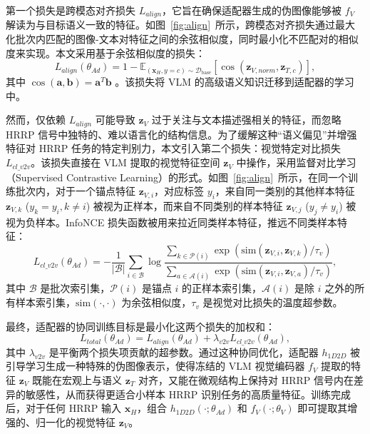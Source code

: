 第一个损失是跨模态对齐损失 $L_{align}$，它旨在确保适配器生成的伪图像能够被 $f_V$ 解读为与目标语义一致的特征。如图~\ref{fig:align}~所示，跨模态对齐损失通过最大化批次内匹配的图像-文本对特征之间的余弦相似度，同时最小化不匹配对的相似度来实现。本文采用基于余弦相似度的损失： \begin{equation} L_{align}(\theta_{Ad}) = 1 - \mathbb{E}_{(\mathbf{x}_H, y=c) \sim \mathcal{D}_{\text{base}}} \left[ \cos(\mathbf{z}_{V, norm}, \mathbf{z}_{T,c}) \right], \label{eq:adapter_align_loss_detail} \end{equation} 其中 $\cos(\mathbf{a}, \mathbf{b}) = \mathbf{a}^T \mathbf{b}$ 。该损失将 VLM 的高级语义知识迁移到适配器的学习中。

然而，仅依赖 $L_{align}$ 可能导致 $\mathbf{z}_V$ 过于关注与文本描述强相关的特征，而忽略 HRRP 信号中独特的、难以语言化的结构信息。为了缓解这种“语义偏见”并增强特征对 HRRP 任务的特定判别力，本文引入第二个损失：视觉特定对比损失 $L_{cl\_v2v}$。该损失直接在 VLM 提取的视觉特征空间 $\mathbf{z}_V$ 中操作，采用监督对比学习（Supervised Contrastive Learning）的形式。如图~\ref{fig:align}~所示，在同一个训练批次内，对于一个锚点特征 $\mathbf{z}_{V,i}$，对应标签 $y_i$，来自同一类别的其他样本特征 $\mathbf{z}_{V,k}$ ($y_k=y_i, k \neq i$) 被视为正样本，而来自不同类别的样本特征 $\mathbf{z}_{V,j}$ ($y_j \neq y_i$) 被视为负样本。InfoNCE 损失函数被用来拉近同类样本特征，推远不同类样本特征：
\begin{equation} L_{cl\_v2v}(\theta_{Ad}) = -\frac{1}{|\mathcal{B}|}\sum_{i \in \mathcal{B}} \log \frac{\sum_{k \in \mathcal{P}(i)} \exp(\text{sim}(\mathbf{z}_{V,i}, \mathbf{z}_{V,k}) / \tau_v)}{\sum_{a \in \mathcal{A}(i)} \exp(\text{sim}(\mathbf{z}_{V,i}, \mathbf{z}_{V,a}) / \tau_v)}, \label{eq:adapter_contrastive_loss} \end{equation}
其中 $\mathcal{B}$ 是批次索引集，$\mathcal{P}(i)$ 是锚点 $i$ 的正样本索引集，$\mathcal{A}(i)$ 是除 $i$ 之外的所有样本索引集，$\text{sim}(\cdot, \cdot)$ 为余弦相似度，$\tau_v$ 是视觉对比损失的温度超参数。

最终，适配器的协同训练目标是最小化这两个损失的加权和： \begin{equation} L_{total}(\theta_{Ad}) = L_{align}(\theta_{Ad}) + \lambda_{v2v} L_{cl\_v2v}(\theta_{Ad}), \label{eq:adapter_total_loss} \end{equation} 其中 $\lambda_{v2v}$ 是平衡两个损失项贡献的超参数。通过这种协同优化，适配器 $h_{1D2D}$ 被引导学习生成一种特殊的伪图像表示，使得冻结的 VLM 视觉编码器 $f_V$ 提取的特征 $\mathbf{z}_V$ 既能在宏观上与语义 $\mathbf{z}_T$ 对齐，又能在微观结构上保持对 HRRP 信号内在差异的敏感性，从而获得更适合小样本 HRRP 识别任务的高质量特征。训练完成后，对于任何 HRRP 输入 $\mathbf{x}_H$，组合 $h_{1D2D}(\cdot; \theta_{Ad})$ 和 $f_V(\cdot; \theta_V)$ 即可提取其增强的、归一化的视觉特征 $\mathbf{z}_V$。

